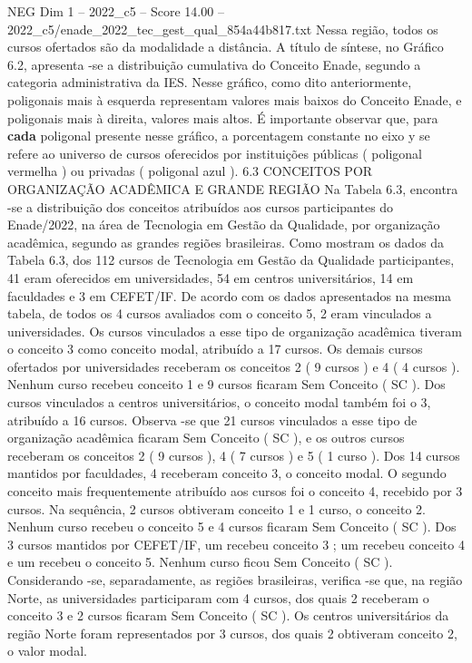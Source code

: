 \begin{textsample}{NEG Dim 1 – 2022\_c5 – Score 14.00 – 2022\_c5/enade\_2022\_tec\_gest\_qual\_854a44b817.txt}
Nessa região, todos os cursos ofertados são da modalidade a distância.
A título de síntese, no Gráfico 6.2, apresenta -se a distribuição cumulativa do Conceito Enade, segundo a categoria administrativa da IES.
Nesse gráfico, como dito anteriormente, poligonais mais à esquerda representam valores mais baixos do Conceito Enade, e poligonais mais à direita, valores mais altos.
É importante observar que, para \textbf{cada} poligonal presente nesse gráfico, a porcentagem constante no eixo y se refere ao universo de cursos oferecidos por instituições públicas ( poligonal vermelha ) ou privadas ( poligonal azul ). 6.3 CONCEITOS POR ORGANIZAÇÃO ACADÊMICA E GRANDE REGIÃO Na Tabela 6.3, encontra -se a distribuição dos conceitos atribuídos aos cursos participantes do Enade/2022, na área de Tecnologia em Gestão da Qualidade, por organização acadêmica, segundo as grandes regiões brasileiras.
Como mostram os dados da Tabela 6.3, dos 112 cursos de Tecnologia em Gestão da Qualidade participantes, 41 eram oferecidos em universidades, 54 em centros universitários, 14 em faculdades e 3 em CEFET/IF.
De acordo com os dados apresentados na mesma tabela, de todos os 4 cursos avaliados com o conceito 5, 2 eram vinculados a universidades.
Os cursos vinculados a esse tipo de organização acadêmica tiveram o conceito 3 como conceito modal, atribuído a 17 cursos.
Os demais cursos ofertados por universidades receberam os conceitos 2 ( 9 cursos ) e 4 ( 4 cursos ).
Nenhum curso recebeu conceito 1 e 9 cursos ficaram Sem Conceito ( SC ).
Dos cursos vinculados a centros universitários, o conceito modal também foi o 3, atribuído a 16 cursos.
Observa -se que 21 cursos vinculados a esse tipo de organização acadêmica ficaram Sem Conceito ( SC ), e os outros cursos receberam os conceitos 2 ( 9 cursos ), 4 ( 7 cursos ) e 5 ( 1 curso ).
Dos 14 cursos mantidos por faculdades, 4 receberam conceito 3, o conceito modal.
O segundo conceito mais frequentemente atribuído aos cursos foi o conceito 4, recebido por 3 cursos.
Na sequência, 2 cursos obtiveram conceito 1 e 1 curso, o conceito 2.
Nenhum curso recebeu o conceito 5 e 4 cursos ficaram Sem Conceito ( SC ).
Dos 3 cursos mantidos por CEFET/IF, um recebeu conceito 3 ; um recebeu conceito 4 e um recebeu o conceito 5.
Nenhum curso ficou Sem Conceito ( SC ).
Considerando -se, separadamente, as regiões brasileiras, verifica -se que, na região Norte, as universidades participaram com 4 cursos, dos quais 2 receberam o conceito 3 e 2 cursos ficaram Sem Conceito ( SC ).
Os centros universitários da região Norte foram representados por 3 cursos, dos quais 2 obtiveram conceito 2, o valor modal.

\end{textsample}
